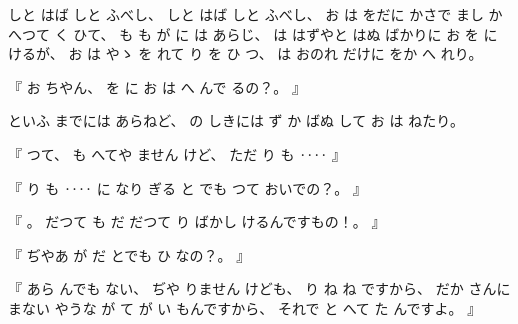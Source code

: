 
%
しと
はば
しと
ふべし、
%
しと
はば
しと
ふべし、
%
お
は
をだに
かさで
まし
かへつて
く
ひて、
%
も
も%
が
に
は
あらじ、
%
は
はずやと
はぬ
ばかりに
お
を
に
けるが、
%
お
は
やゝ
を
れて
り
を
ひ
つ、
%
は
おのれ
だけに
をか
へ
れり。

%
『
お
ちやん、
%
を
に
お
は
へ
んで
るの？。
』

%
といふ
までには
あらねど、
%
の
しきには
ず
か
ばぬ%
して
お
は
ねたり。

%
『
つて、
%
も
へてや
ません
けど、
%
ただ%
り
も
‥‥
』

%
『
り
も
‥‥
に
なり
ぎる
と
でも
つて
おいでの？。
』

%
『
。
%
だつて
も
だ
だつて
り
ばかし
けるんですもの！。
』

%
『
ぢやあ
が
だ
とでも
ひ
なの？。
』

%
『
あら
んでも
ない、
%
ぢや
りません
けども、
%
り
ね
ね%
ですから、
%
だか
さんに
まない
やうな
が
て
が
い
もんですから、
%
それで
と
へて
た
んですよ。
』


